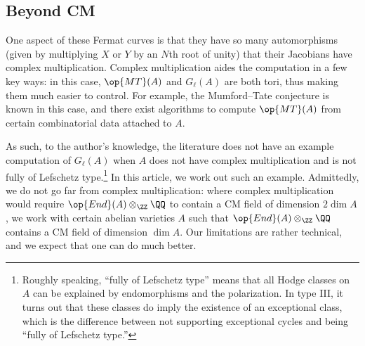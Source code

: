 \documentclass[openany]{book}
\begin{document}
\subsection{Beyond CM}
One aspect of these Fermat curves is that they have so many automorphisms (given by multiplying $X$ or $Y$ by an $N$th root of unity) that their Jacobians have complex multiplication. Complex multiplication aides the computation in a few key ways: in this case, $\op{MT}(A)$ and $G_\ell(A)$ are both tori, thus making them much easier to control. For example, the Mumford--Tate conjecture is known in this case, and there exist algorithms to compute $\op{MT}(A)$ from certain combinatorial data attached to $A$.

As such, to the author's knowledge, the literature does not have an example computation of $G_\ell(A)$ when $A$ does not have complex multiplication and is not fully of Lefschetz type.\footnote{Roughly speaking, ``fully of Lefschetz type'' means that all Hodge classes on $A$ can be explained by endomorphisms and the polarization. In type III, it turns out that these classes do imply the existence of an exceptional class, which is the difference between not supporting exceptional cycles and being ``fully of Lefschetz type.''} In this article, we work out such an example. Admittedly, we do not go far from complex multiplication: where complex multiplication would require $\op{End}(A)\otimes_\ZZ\QQ$ to contain a CM field of dimension $2\dim A$, we work with certain abelian varieties $A$ such that $\op{End}(A)\otimes_\ZZ\QQ$ contains a CM field of dimension $\dim A$. Our limitations are rather technical, and we expect that one can do much better.
\end{document}
